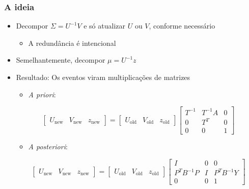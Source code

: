 \documentclass{beamer}
\begin{document}
\begin{frame}\frametitle{A ideia}
\begin{itemize}
	\item Decompor $\Sigma = U^{-1}V$ e só atualizar $U$ ou $V$, conforme necessário
	\begin{itemize}
		\item A redundância é intencional
	\end{itemize}
	\item Semelhantemente, decompor $\mu = U^{-1}z$
	\item \pause  Resultado: Os eventos viram multiplicações de matrizes
	\begin{itemize}
		\item \textit{A priori}:
	\end{itemize}
	$$\left[\begin{matrix} U_\text{new} & V_\text{new} & z_\text{new} \end{matrix}\right] = \left[\begin{matrix} U_\text{old} & V_\text{old} & z_\text{old} \end{matrix}\right]\left[\begin{matrix} T^{-1} & T^{-1}A & 0 \\ 0 & T^T & 0 \\ 0 & 0 & 1 \end{matrix}\right]$$
	\begin{itemize}
		\item \textit{A posteriori}:
	\end{itemize}
	$$\left[\begin{matrix} U_\text{new} & V_\text{new} & z_\text{new} \end{matrix}\right] = \left[\begin{matrix} U_\text{old} & V_\text{old} & z_\text{old} \end{matrix}\right]\left[\begin{matrix} I & 0 & 0 \\ P^TB^{-1}P & I & P^TB^{-1}Y \\ 0 & 0 & 1 \end{matrix}\right]$$
\end{itemize}
\end{frame}
\end{document}
